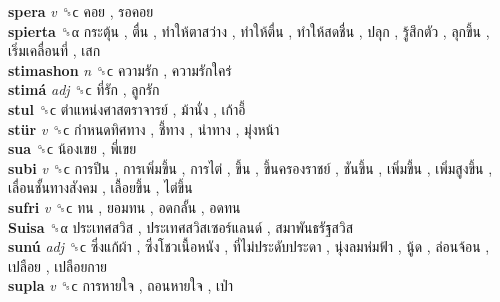 \textbf{spera} \emph{v}  ␝ϲ   คอย ,  รอคอย   \\
\textbf{spierta} ␝α   กระตุ้น ,  ตื่น ,  ทำให้ตาสว่าง ,  ทำให้ตื่น ,  ทำให้สดชื่น ,  ปลุก ,  รู้สึกตัว ,  ลุกขึ้น ,  เริ่มเคลื่อนที่ ,  เสก   \\
\textbf{stimashon} \emph{n}  ␝ϲ   ความรัก ,  ความรักใคร่   \\
\textbf{stimá} \emph{adj}  ␝ϲ   ที่รัก ,  ลูกรัก   \\
\textbf{stul} ␝ϲ   ตำแหน่งศาสตราจารย์ ,  ม้านั่ง ,  เก้าอี้   \\
\textbf{stür} \emph{v}  ␝ϲ   กำหนดทิศทาง ,  ชี้ทาง ,  นำทาง ,  มุ่งหน้า   \\
\textbf{sua} ␝ϲ   น้องเขย ,  พี่เขย   \\
\textbf{subi} \emph{v}  ␝ϲ   การปีน ,  การเพิ่มขึ้น ,  การไต่ ,  ขึ้น ,  ขึ้นครองราชย์ ,  ชันขึ้น ,  เพิ่มขี้น ,  เพิ่มสูงขึ้น ,  เลื่อนชั้นทางสังคม ,  เลื้อยขึ้น ,  ไต่ขึ้น   \\
\textbf{sufri} \emph{v}  ␝ϲ   ทน ,  ยอมทน ,  อดกลั้น ,  อดทน   \\
\textbf{Suisa} ␝α   ประเทศสวิส ,  ประเทศสวิสเซอร์แลนด์ ,  สมาพันธรัฐสวิส   \\
\textbf{sunú} \emph{adj}  ␝ϲ   ซึ่งแก้ผ้า ,  ซึ่งโชวเนื้อหนัง ,  ที่ไม่ประดับประดา ,  นุ่งลมห่มฟ้า ,  นู้ด ,  ล่อนจ้อน ,  เปลือย ,  เปลือยกาย   \\
\textbf{supla} \emph{v}  ␝ϲ   การหายใจ ,  ถอนหายใจ ,  เป่า   \\
